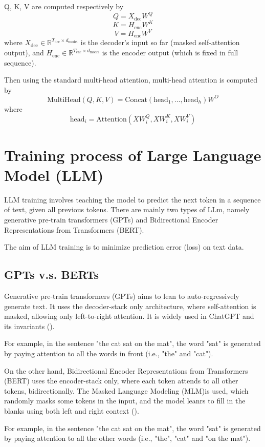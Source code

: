 \documentclass{article} %
\begin{document}
Q, K, V are computed respectively by
\[ Q = X_{\text{dec}} W^Q\]
\[K = H_{\text{enc}} W^K \]
\[ V = H_{\text{enc}} W^V \]
where \( X_{\text{dec}} \in \mathbb{R}^{T_{\text{dec}} \times d_{\text{model}}} \) is the decoder's input so far (masked self-attention output), and \( H_{\text{enc}} \in \mathbb{R}^{T_{\text{enc}} \times d_{\text{model}}} \) is the encoder output (which is fixed in full sequence).

Then using the standard multi-head attention, multi-head attention is computed by
\[
\text{MultiHead}(Q, K, V) = \text{Concat}(\text{head}_1, \dots, \text{head}_h)W^O
    \] where
    \[
\text{head}_i = \text{Attention}(XW_i^Q, XW_i^K, XW_i^V)
    \]


\section{Training process of Large Language Model (LLM)}
LLM training involves teaching the model to predict the next token in a sequence of text, given all previous tokens. There are mainly two types of LLm, namely generative pre-train transformers (GPTs) and Bidirectional Encoder Representations from Transformers (BERT).

The aim of LLM training is to minimize prediction error (loss) on text data.

\subsection{GPTs v.s. BERTs}
Generative pre-train transformers (GPTs) aims to lean to auto-regressively generate text. It uses the decoder-stack only architecture, where self-attention is masked, allowing only left-to-right attention. It is widely used in ChatGPT and its invariants (\cite{radford2018improving}).

For example, in the sentence "the cat sat on the mat", the word "sat" is generated by paying attention to all the words in front (i.e., "the" and "cat").

On the other hand, Bidirectional Encoder Representations from Transformers (BERT) uses the encoder-stack only, where each token attends to all other tokens, bidirectionally. The Masked Language Modeling (MLM)is used, which randomly masks some tokens in the input, and the model leanrs to fill in the blanks using both left and right context (\cite{devlin2018bert}).

For example, in the sentence "the cat sat on the mat", the word "sat" is generated by paying attention to all the other words (i.e., "the", "cat" and "on the mat").
\end{document}

